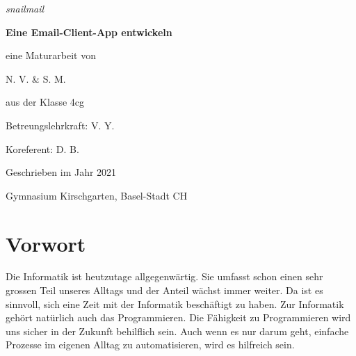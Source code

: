 \documentclass[a4paper,11pt]{article}
\begin{document}
\begin{titlepage}

	\centering
	
    \vspace{5cm}
    {\slshape\large snailmail \par}
    \vspace{0.1cm}
	{\huge\bfseries Eine Email-Client-App entwickeln \par}
	\vspace{0.5cm}
	{\Large eine Maturarbeit von \par}
	{\Large N. V. \& S. M. \par}
    {\Large aus der Klasse 4cg \par}
    \vspace{0.5cm}
   
    \vspace{0.5cm}
    {\Large Betreungslehrkraft: V. Y. \par }
    {\Large Koreferent: D. B. \par}
    \vspace{0.5cm}
	{\large Geschrieben im Jahr 2021 \par}
    {\large Gymnasium Kirschgarten, Basel-Stadt CH \par}
	
\end{titlepage}

\tableofcontents
\pagebreak

\section{Vorwort}
Die Informatik ist heutzutage allgegenwärtig. Sie umfasst schon einen sehr grossen Teil unseres Alltags und der Anteil wächst immer weiter. Da ist es sinnvoll, sich 
eine Zeit mit der Informatik beschäftigt zu haben. Zur Informatik gehört natürlich auch das Programmieren. Die Fähigkeit zu Programmieren wird uns sicher in der
Zukunft behilflich sein. Auch wenn es nur darum geht, einfache Prozesse im eigenen Alltag zu automatisieren, wird es hilfreich sein. 
\end{document}

